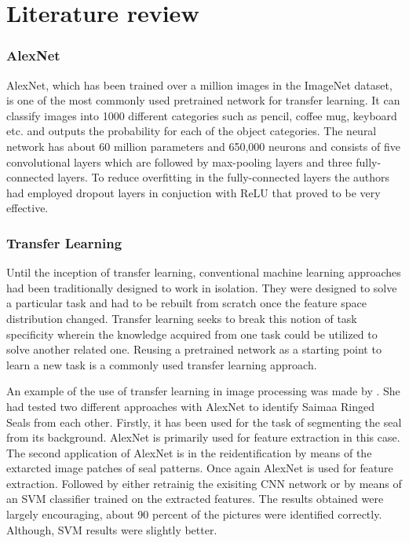 \documentclass[doc/report.tex]{subfiles}
\begin{document}
\section{Literature review}

\subsubsection{AlexNet}
AlexNet\cite{Alex}, which has been trained over a million images in the
ImageNet dataset, is one of the most commonly used pretrained network for
transfer learning. It can classify images into 1000 different categories such
as pencil, coffee mug, keyboard etc. and outputs the probability for each of
the object categories. The neural network has about 60 million parameters and
650,000 neurons and consists of five convolutional layers which are followed by
max-pooling layers and three fully-connected layers. To reduce overfitting in
the fully-connected layers the authors had  employed dropout layers in
conjuction with ReLU that proved to be very effective.

\subsubsection{Transfer Learning}
Until the inception of transfer learning, conventional machine learning
approaches had been traditionally designed to work in isolation. They were
designed to solve a particular task and had to be rebuilt from scratch once the
feature space distribution changed. Transfer learning seeks to break this
notion of task specificity wherein the knowledge acquired from one task could
be utilized to solve another related one. Reusing a pretrained network as a
starting point to learn a new task is a commonly used transfer learning
approach.

An example of the use of transfer learning in image processing was made by
\cite{Ekat}. She had tested two different approaches with AlexNet to identify
Saimaa Ringed Seals from each other. Firstly, it has been used for the task of
segmenting the seal from its background. AlexNet is primarily used for feature
extraction in this case. The second application of AlexNet is in the
reidentification by means of the extarcted image patches of seal patterns. Once
again AlexNet is used for feature extraction. Followed by either retrainig the
exisiting CNN network or by means of an SVM classifier trained on the extracted
features. The results obtained were largely encouraging, about 90 percent of
the pictures were identified correctly. Although, SVM results were slightly
better.
    
\end{document}

